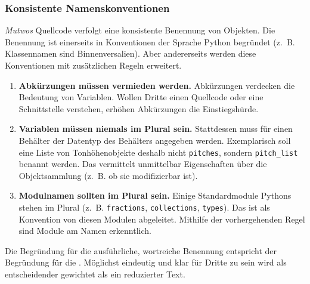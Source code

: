 \documentclass[12pt,a4paper,ngerman]{article}
\begin{document}
\subsubsection{Konsistente Namenskonventionen}

\emph{Mutwos} Quellcode verfolgt eine konsistente Benennung von Objekten.
Die Benennung ist einerseits in Konventionen der Sprache Python begründet (z.~B. Klassennamen sind Binnenversalien).
Aber andererseits werden diese Konventionen mit zusätzlichen Regeln erweitert.

\begin{enumerate}
    \item{%
            \textbf{Abkürzungen müssen vermieden werden.}
            Abkürzungen verdecken die Bedeutung von Variablen.
            Wollen Dritte einen Quellcode oder eine Schnittstelle verstehen, erhöhen Abkürzungen die Einstiegshürde.
    }
    \item{%
            \textbf{Variablen müssen niemals im Plural sein.}
            Stattdessen muss für einen Behälter der Datentyp des Behälters angegeben werden.
            Exemplarisch soll eine Liste von Tonhöhenobjekte deshalb nicht \texttt{pitches}, sondern \texttt{pitch\_list} benannt werden.
            Das vermittelt unmittelbar Eigenschaften über die Objektsammlung (z.~B. ob sie modifizierbar ist).
    }
    \item{%
            \textbf{Modulnamen sollten im Plural sein.}
            Einige Standardmodule Pythons stehen im Plural (z.~B. \texttt{fractions}, \texttt{collections}, \texttt{types}).
            Das ist als Konvention von diesen Modulen abgeleitet.
            Mithilfe der vorhergehenden Regel sind Module am Namen erkenntlich.
    }
\end{enumerate}

Die Begründung für die ausführliche, wortreiche Benennung entspricht der Begründung für die \emph{}.
Möglichst eindeutig und klar für Dritte zu sein wird als entscheidender gewichtet als ein reduzierter Text.


% 
\end{document}
